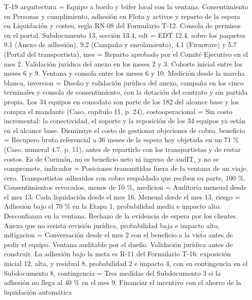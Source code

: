 \begin{formulario}{T-19}
{  arquitectura = {Equipo a bordo y búfer local con la ventana. Consentimiento en Personas y cumplimiento, adhesión en Flota y activos y reparto de la espera en Liquidación y costeo, regla RN-08 del Formulario T-12. Consola de permisos en el portal. Subdocumento 13, sección 13.4},
  edt = {EDT 12.4, sobre los paquetes 9.1 (Anexo de adhesión), 9.2 (Campaña y enrolamiento), 4.1 (Firmware) y 5.7 (Portal del transportista)},
  mes = {Reparto aprobado por el Comité Ejecutivo en el mes 2. Validación jurídica del anexo en los meses 2 y 3. Cohorte inicial entre los meses 6 y 9. Ventana y consola entre los meses 6 y 10. Medición desde la marcha blanca},
  inversion = {Diseño y validación jurídica del anexo, campaña en los cinco terminales y consola de consentimiento, con la dotación del contrato y sin partida propia. Los 34 equipos en comodato son parte de los 182 del alcance base y los compra el mandante (Caso, capítulo 11, p. 24)},
  costooperacional = {Sin costo incremental: la conectividad, el soporte y la reposición de los 34 equipos ya están en el alcance base. Disminuye el costo de gestionar objeciones de cobro},
  beneficio = {Recupero bruto referencial a 36 meses de la espera hoy objetada en un 71 \% (Caso, numeral 4.7, p. 11), antes de repartirlo con los transportistas y de restar costos. Es de Curimón, no es beneficio neto ni ingreso de audIT, y no se compromete},
  indicador = {Posiciones transmitidas fuera de la ventana de un viaje, cero. Transportistas adheridos con cobro respaldado que reciben su parte, 100 \%. Consentimientos revocados, menos de 10 \%},
  medicion = {Auditoría mensual desde el mes 13. Cada liquidación desde el mes 16. Mensual desde el mes 13},
  riesgo = {Adhesión bajo el 70 \% en la Etapa 1, probabilidad media e impacto alto. Desconfianza en la ventana. Rechazo de la evidencia de espera por los clientes. Anexo que no resista revisión jurídica, probabilidad baja e impacto alto},
  mitigacion = {Conversación desde el mes 2 con el beneficio a la vista antes de pedir el equipo. Ventana auditable por el dueño. Validación jurídica antes de construir. La adhesión bajo la meta es R-11 del Formulario T-16: exposición inicial 12, alta, y residual 8, probabilidad 2 e impacto 4, con su contingencia en el Subdocumento 8},
  contingencia = {Tres medidas del Subdocumento 3 si la adhesión no llega al 40 \% en el mes 9. Financiar el incentivo con el ahorro de la liquidación automática}
}
\end{formulario}
